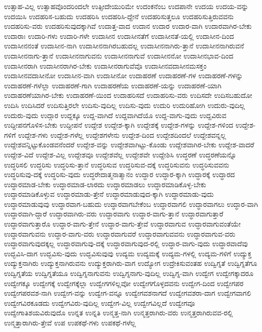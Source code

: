 {ಉತ್ಸಾಹ-ವಿಲ್ಲ
ಉತ್ಸಾಹವೊಂದರಿಂದಲೇ
ಉತ್ಸೀದೇಯುರಿಮೇ
ಉದಂಕನೆಂಬ
ಉದಪಾನೇ
ಉದಯ
ಉದಯ-ವನ್ನು
ಉದಯಿಸಿ
ಉದಹರಿಸ-ಬಹುದು
ಉದಹರಿಸಿ
ಉದಹರಿಸಿ-ದ್ದೇನೆ
ಉದಹರಿಸುತ್ತಲೂ
ಉದಹರಿಸುತ್ತಿರುವವನು
ಉದಹರಿಸು-ವರು
ಉದಹರಿಸುವುದಕ್ಕಾಗಿವೆ
ಉದಾತ್ತ-ವಾದ
ಉದಾನ
ಉದಾರ
ಉದಾರ-ವಾಗಿ
ಉದಾರವಾಗಿರ-ಬೇಕು
ಉದಾರಾಃ
ಉದಾರಿ-ಗಳು
ಉದಾರಿ-ಗಳೇ
ಉದಾಸೀನ
ಉದಾಸೀನತೆಗೆ
ಉದಾಸೀನತೆ-ಯಲ್ಲಿ
ಉದಾಸೀನ-ದಿಂದ
ಉದಾಸೀನನಂತೆ
ಉದಾಸೀನ-ನಾಗಿ
ಉದಾಸೀನನಾಗಿರಬಹುದಲ್ಲ
ಉದಾಸೀನನಾಗಿರು-ತ್ತಾನೆ
ಉದಾಸೀನನಾಗಿರುವನೆ
ಉದಾಸೀನನಾಗು-ತ್ತಾನೆ
ಉದಾಸೀನನಾಗುವನು
ಉದಾಸೀನನಾಗುವೆ
ಉದಾಸೀನನೋ
ಉದಾಸೀನಭಾವ-ದಿಂದ
ಉದಾಸೀನರಾಗಿ
ಉದಾಸೀನರಾಗಿರ-ಬೇಕು
ಉದಾಸೀನರಾಗುವೆವೊ
ಉದಾಸೀನವದಾಸೀನಮಸಕ್ತಂ
ಉದಾಸೀನವದಾಸೀನೋ
ಉದಾಸೀನ-ವಾಗಿ
ಉದಾಸೀನೋ
ಉದಾಹರಣೆ
ಉದಾಹರಣೆ-ಗಳ
ಉದಾಹರಣೆ-ಗಳನ್ನು
ಉದಾಹರಣೆ-ಗಳೆಲ್ಲಾ
ಉದಾಹರಣೆ-ಗಾಗಿ
ಉದಾಹರಣೆಯ
ಉದಾಹರಣೆ-ಯನ್ನು
ಉದಾಹರಣೆ-ಯಾಗಿ
ಉದಾಹರಣೆಯಾಗಿರ-ಬೇಕು
ಉದಾಹರಣೆ-ಯಿಂದ
ಉದಾಹರಿಸದೆ
ಉದಾಹರಿಸು-ವರು
ಉದಿಸದೇ
ಉದಿಸಬಹುದೋ
ಉದಿಸಿ
ಉದಿಸಿದರೆ
ಉದಿಸುತ್ತಿರಲೇ
ಉದಿಸು-ವುದಿಲ್ಲ
ಉದಿಸು-ವುದು
ಉದುರಿ
ಉದುರಿಹೋಗಿ
ಉದುರು-ವುದಿಲ್ಲ
ಉದುರು-ವುದು
ಉದ್ಗಾರ
ಉದ್ದಕ್ಕೂ
ಉದ್ದ-ವಾಗಿದೆ
ಉದ್ದವಾಗಿದೆಯೊ
ಉದ್ದ-ವಾಗು-ವುದು
ಉದ್ದವಿರುವ
ಉದ್ದೀಪನಗೊಳಿಸ-ಬೇಕು
ಉದ್ದೀಪನೆ
ಉದ್ದೇಶ
ಉದ್ದೇಶ-ಕ್ಕಾಗಿ
ಉದ್ದೇಶಕ್ಕೆ
ಉದ್ದೇಶ-ಗಳನ್ನು
ಉದ್ದೇಶ-ಗಳಿಂದ
ಉದ್ದೇಶ-ಗಳಿಗೆ
ಉದ್ದೇಶ-ಗಳು
ಉದ್ದೇಶ-ಗಳೆಲ್ಲ
ಉದ್ದೇಶಗಳೇನು
ಉದ್ದೇಶ-ದಿಂದ
ಉದ್ದೇಶದಿಂದಲೆ
ಉದ್ದೇಶವನ್ನಲ್ಲ
ಉದ್ದೇಶವನ್ನಿಟ್ಟುಕೊಂಡವನೆಂದರೆ
ಉದ್ದೇಶ-ವನ್ನು
ಉದ್ದೇಶವಾಗಿಟ್ಟು-ಕೊಂಡು
ಉದ್ದೇಶವಾಗಿರ-ಬೇಕು
ಉದ್ದೇಶ-ವಾದರೆ
ಉದ್ದೇಶ-ವಿದೆ
ಉದ್ದೇಶ-ವಿಲ್ಲ
ಉದ್ದೇಶವೂ
ಉದ್ದೇಶವೆಲ್ಲ
ಉದ್ದೇಶವೇ
ಉದ್ದೇಶಿಸಿ
ಉದ್ಧರಣೆ
ಉದ್ಧರಣೆಯನ್ನೊ
ಉದ್ಧರಿಸಲಿ
ಉದ್ಧರಿಸು
ಉದ್ಧರಿಸು-ತ್ತಾನೆ
ಉದ್ಧರಿಸುವ
ಉದ್ಧರಿಸುವ-ದಕ್ಕೆ
ಉದ್ಧರಿಸುವನು
ಉದ್ಧರಿಸುವವನು
ಉದ್ಧರಿಸುವು-ದಕ್ಕೆ
ಉದ್ಧರಿಸು-ವುದು
ಉದ್ಧರೇದಾತ್ಮನಾತ್ಮಾನಂ
ಉದ್ಧಾರ
ಉದ್ಧಾರ-ಕ್ಕಾಗಿ
ಉದ್ಧಾರಕ್ಕೆ
ಉದ್ಧಾರದ
ಉದ್ಧಾರಮಾಡ-ಬೇಕು
ಉದ್ಧಾರಮಾಡ-ಲಾರದು
ಉದ್ಧಾರಮಾಡಲು
ಉದ್ಧಾರಮಾಡಿಕೊಳ್ಳ-ಬೇಕು
ಉದ್ಧಾರಮಾಡಿಕೊಳ್ಳುವ
ಉದ್ಧಾರಮಾಡು-ತ್ತೇನೆ
ಉದ್ಧಾರಮಾಡುವುದ-ಕ್ಕಾಗಿ
ಉದ್ಧಾರಮಾಡು-ವುದು
ಉದ್ಧಾರಮಾಡುವುವು
ಉದ್ಧಾರವಾಗ-ಬಹುದು
ಉದ್ಧಾರವಾಗಬೇಕೆಂಬ
ಉದ್ಧಾರವಾಗಲಿ
ಉದ್ಧಾರವಾಗಲು
ಉದ್ಧಾರ-ವಾಗಿ
ಉದ್ಧಾರವಾಗಿ-ದ್ದಾರೆ
ಉದ್ಧಾರವಾಗಿರು-ವರು
ಉದ್ಧಾರವಾಗು
ಉದ್ಧಾರ-ವಾಗು-ತ್ತಾನೆ
ಉದ್ಧಾರವಾಗುತ್ತಾರೆ
ಉದ್ಧಾರವಾಗುತ್ತಾರೊ
ಉದ್ಧಾರ-ವಾಗು-ತ್ತೇನೆ
ಉದ್ಧಾರ-ವಾಗು-ತ್ತೇವೆ
ಉದ್ಧಾರವಾಗುವ
ಉದ್ಧಾರವಾಗುವಂತೆಯೇ
ಉದ್ಧಾರವಾಗುವನು
ಉದ್ಧಾರ-ವಾಗು-ವರು
ಉದ್ಧಾರವಾಗುವರೆ
ಉದ್ಧಾರವಾಗುವವನು
ಉದ್ಧಾರವಾಗುವ-ವರು
ಉದ್ಧಾರವಾಗುವುದಕ್ಕಲ್ಲ
ಉದ್ಧಾರವಾಗುವು-ದಕ್ಕೆ
ಉದ್ಧಾರವಾಗುವುದ-ರಲ್ಲಿ
ಉದ್ಧಾರ-ವಾಗು-ವುದು
ಉದ್ಧಾರವಾದೆವು
ಉದ್ಭವಿಸಿ-ದಾಗ
ಉದ್ಭವಿಸು-ವುದು
ಉದ್ಭವಿಸುವುವು
ಉದ್ಯಮ
ಉದ್ಯಮಕ್ಕೆ
ಉದ್ಯಮ-ಗಳಲ್ಲಿ
ಉದ್ಯಮ-ಗಳಿಗೆ
ಉದ್ಯುಕ್ತ
ಉದ್ಯುಕ್ತನಾಗಿರು
ಉದ್ಯುಕ್ತನಾಗಿರುವನು
ಉದ್ಯುಕ್ತರಾಗಿರು-ವಾಗ
ಉದ್ಯೋಗ
ಉದ್ರೇಕಿಸುವಂತಹ
ಉದ್ವಿಗ್ನತೆ
ಉದ್ವಿಗ್ನತೆಗೂ
ಉದ್ವಿಗ್ನತೆಯ
ಉದ್ವಿಗ್ನತೆಯೂ
ಉದ್ವಿಗ್ನನಾಗುವನು
ಉದ್ವಿಗ್ನನಾಗು-ವುದಿಲ್ಲ
ಉದ್ವಿಗ್ನ-ವಾಗಿ
ಉದ್ವೇಗ
ಉದ್ವೇಗಕ್ಕಾದರೂ
ಉದ್ವೇಗಕ್ಕೂ
ಉದ್ವೇಗಕ್ಕೆ
ಉದ್ವೇಗಕ್ಕೆಲ್ಲಾ
ಉದ್ವೇಗಗಳಿಲ್ಲವೋ
ಉದ್ವೇಗಗೊಳ್ಳದವನು
ಉದ್ವೇಗ-ದಿಂದ
ಉದ್ವೇಗಪರ
ಉದ್ವೇಗಪರವಶ-ನಾಗಿ
ಉದ್ವೇಗ-ವನ್ನು
ಉದ್ವೇಗ-ವನ್ನೂ
ಉದ್ವೇಗವಶನಾಗದೆ
ಉದ್ವೇಗವಶರಾ-ದಾಗ
ಉದ್ವೇಗವಾಗಲಿ
ಉದ್ವೇಗವಿರಕೂಡದು
ಉದ್ವೇಗವಿರು-ವುದಿಲ್ಲ
ಉದ್ವೇಗ-ವಿಲ್ಲ
ಉದ್ವೇಗವಿಲ್ಲದೆ
ಉದ್ವೇಗವೂ
ಉದ್ವೇಗಾತಿಶಯವಿರುವುದೊ
ಉನ್ನತ
ಉನ್ನತಿ
ಉನ್ಮತ್ತ-ನಾಗಿ
ಉನ್ಮತ್ತರಾಗಿರು-ವರು
ಉನ್ಮತ್ತರಾಗಿರುವವ-ರಲ್ಲಿ
ಉನ್ಮತ್ತಾರಾಗಿರು-ತ್ತೇವೆ
ಉಪ
ಉಪಕಥೆ-ಗಳು
ಉಪಕಥೆ-ಗಳೆಲ್ಲ
}
